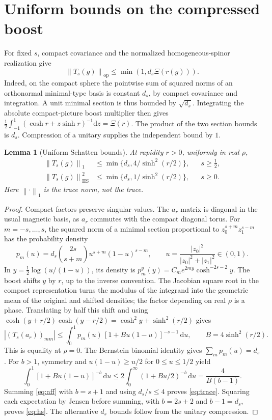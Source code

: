 \documentclass[11pt]{article}
\newtheorem{lemma}[theorem]{Lemma}
\theoremstyle{remark}
\newcommand{\dd}{\mathrm d}
\newcommand{\op}{\mathrm{op}}
\newcommand{\norm}[1]{\left\lVert #1\right\rVert}
\begin{document}
\section{Uniform bounds on the compressed boost}
For fixed \(s\), compact covariance and the normalized homogeneous-spinor realization \cite[Sec.~2]{Barrett} give
\begin{equation}\label{eq:spherical}
 \norm{T_s(g)}_{\op}\le \min(1,d_s\Xi(r(g))).
\end{equation}
Indeed, on the compact sphere the pointwise sum of squared norms of an orthonormal minimal-type basis is constant \(d_s\), by compact covariance and integration. A unit minimal section is thus bounded by \(\sqrt{d_s}\). Integrating the absolute compact-picture boost multiplier then gives
\(\tfrac12\int_{-1}^{1}(\cosh r+z\sinh r)^{-1}\dd z=\Xi(r)\).
The product of the two section bounds is \(d_s\). Compression of a unitary supplies the independent bound by \(1\).

\begin{lemma}[Uniform Schatten bounds]\label{lem:boost}
At rapidity \(r>0\), uniformly in real \(\rho\),
\begin{align}
 \norm{T_s(g)}_1 &\le \min\{d_s,4/\sinh^2(r/2)\}, &&s\ge\tfrac12, \label{eq:trace}\\
 \norm{T_s(g)}_{\mathrm{HS}}^2 &\le \min\{d_s,1/\sinh^2(r/2)\}, &&s\ge0. \label{eq:hs}
\end{align}
Here \(\norm{\cdot}_1\) is the trace norm, not the trace.
\end{lemma}
\begin{proof}
Compact factors preserve singular values. The \(a_r\) matrix is diagonal in the usual magnetic basis, as \(a_r\) commutes with the compact diagonal torus. For \(m=-s,\ldots,s\), the squared norm of a minimal section proportional to \(z_0^{s+m}z_1^{s-m}\) has the probability density
\[
 p_m(u)=d_s\binom{2s}{s+m}u^{s+m}(1-u)^{s-m},\qquad
 u=\frac{|z_0|^2}{|z_0|^2+|z_1|^2}\in(0,1).
\]
In \(y=\tfrac12\log(u/(1-u))\), its density is \(p_m^y(y)=C_m e^{2my}\cosh^{-2s-2}y\). The boost shifts \(y\) by \(r\), up to the inverse convention. The Jacobian square root in the compact representation turns the modulus of the integrand into the geometric mean of the original and shifted densities; the factor depending on real \(\rho\) is a phase. Translating by half this shift and using
\(\cosh(y+r/2)\cosh(y-r/2)=\cosh^2y+\sinh^2(r/2)\) gives
\begin{equation}\label{eq:aff}
 |(T_s(a_r))_{mm}|
 \le \int_0^1 p_m(u)\,[1+B u(1-u)]^{-s-1}\,\dd u,\qquad
 B=4\sinh^2(r/2).
\end{equation}
This is equality at \(\rho=0\). The Bernstein binomial identity gives \(\sum_m p_m(u)=d_s\). For \(b>1\), symmetry and \(u(1-u)\ge u/2\) for \(0\le u\le1/2\) yield
\[
 \int_0^1[1+B u(1-u)]^{-b}\,\dd u
 \le 2\int_0^\infty(1+B u/2)^{-b}\,\dd u
 =\frac4{B(b-1)}.
\]
Summing \eqref{eq:aff} with \(b=s+1\) and using \(d_s/s\le4\) proves \eqref{eq:trace}. Squaring each expectation by Jensen before summing, with \(b=2s+2\) and \(b-1=d_s\), proves \eqref{eq:hs}. The alternative \(d_s\) bounds follow from the unitary compression.
\end{proof}
\end{document}
